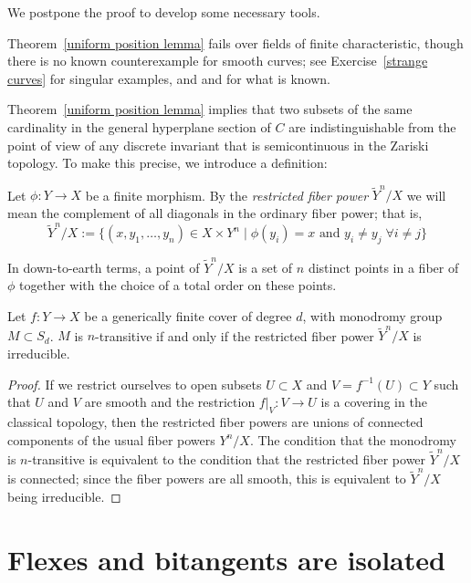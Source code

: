We postpone the proof to develop some necessary tools.

Theorem~\ref{uniform position lemma} fails over fields of finite characteristic, though there is no known counterexample for smooth curves; see Exercise~\ref{strange curves} for singular examples, and \cite{Rathmann} and \cite{Kadets} for what is known. 

Theorem~\ref{uniform position lemma} implies that two subsets of the same cardinality in the general hyperplane section of $C$
are indistinguishable from the point of view of any discrete invariant that is semicontinuous in the Zariski topology. To make this precise, we introduce a definition:

\begin{definition}
Let $\phi : Y \to X$ be a finite morphism. By the \emph{restricted fiber power} $\tilde Y^n/X$ we will mean the complement of all diagonals in the ordinary fiber power; that is,
$$
\tilde Y^n/X := \{ (x, y_1,\dots, y_n) \in X \times Y^n \mid \phi(y_i) = x \text{ and } y_i \neq y_j \; \forall i \neq j \}
$$
\end{definition}

In down-to-earth terms, a point of $\tilde Y^n/X$ is a set of $n$ distinct points in a fiber of $\phi$ together with
the choice of a total order on these points. 

\begin{lemma}\label{transitivity lemma}
Let $f : Y \to X$ be a generically finite cover of degree $d$, with  monodromy group $M \subset S_d$.
$M$ is $n$-transitive if and only if the restricted fiber power $\tilde Y^n/X$ is irreducible.
\end{lemma}

\begin{proof}
If we restrict ourselves to open subsets $U \subset X$ and $V = f^{-1}(U) \subset Y$ such that $U$ and $V$ are smooth and the restriction $f|_V : V \to U$ is a covering in the classical topology, then the restricted fiber powers are unions of connected components of the usual fiber powers $Y^n/X$. The condition that the monodromy is $n$-transitive is equivalent to the condition that the restricted fiber power $\tilde Y^n/X$ is connected; since the fiber powers are all smooth, this is equivalent to $\tilde Y^n/X$ being irreducible.
\end{proof}



\section{Flexes and bitangents are isolated}\label{isolated flexes and bitangents}

